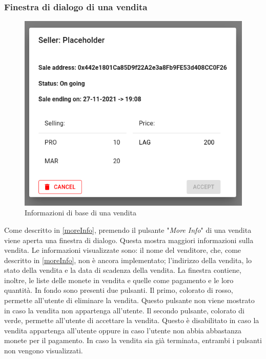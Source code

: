 \documentclass[a4paper]{article}
\begin{document}
        \subsubsection{Finestra di dialogo di una vendita}
        \begin{figure}[H]
          \includegraphics[scale=0.5]{saleInfo.png}
          \centering
          \caption{Informazioni di base di una vendita}
          \centering
          \label{fig:sale}
        \end{figure}
        Come descritto in \ref{moreInfo}, premendo il pulsante "\emph{More Info}" di una vendita viene aperta una finestra di dialogo. Questa mostra maggiori informazioni sulla vendita. Le informazioni visualizzate sono: il nome del venditore, che, come descritto in \ref{moreInfo}, non è ancora implementato;
        l'indirizzo della vendita, lo stato della vendita e la data di scadenza della vendita. La finestra contiene, inoltre, le liste delle monete in vendita e quelle come pagamento e le loro quantità. In fondo sono presenti due pulsanti. Il primo, colorato di rosso, permette all'utente di eliminare la vendita.
        Questo pulsante non viene mostrato in caso la vendita non appartenga all'utente. Il secondo pulsante, colorato di verde, permette all'utente di accettare la vendita. Questo è disabilitato in caso la vendita appartenga all'utente oppure in caso l'utente non abbia abbastanza monete per il pagamento.
        In caso la vendita sia già terminata, entrambi i pulsanti non vengono visualizzati.
\end{document}
